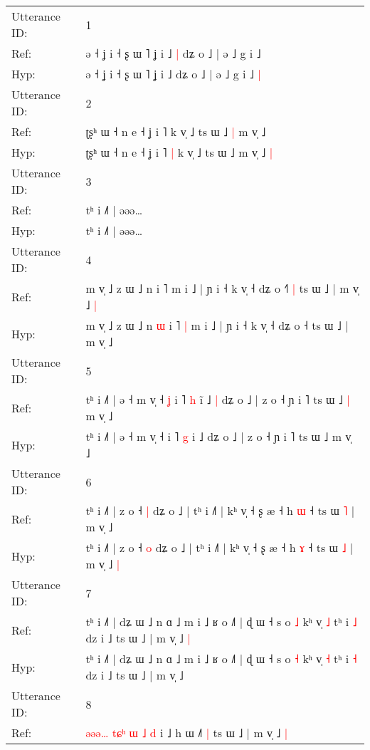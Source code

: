 \documentclass[10pt]{article}
\DeclareRobustCommand{\hl}[1]{{\textcolor{red}{#1}}}
\begin{document}
\begin{longtable}{ll}
\toprule
Utterance ID: & 1 \\
Ref: & ə ˧ ʝ i ˧ ʂ ɯ ˥ ʝ i ˩\hl{ }\hl{|} dʑ o ˩ | ə ˩ g i ˩\hl{}\hl{}
 \\
Hyp: & ə ˧ ʝ i ˧ ʂ ɯ ˥ ʝ i ˩\hl{}\hl{} dʑ o ˩ | ə ˩ g i ˩\hl{ }\hl{|}
 \\
\midrule
Utterance ID: & 2 \\
Ref: & ʈʂʰ ɯ ˧ n e ˧ ʝ i ˥\hl{}\hl{} k v̩ ˩ ts ɯ ˩\hl{ }\hl{|} m v̩ ˩\hl{}\hl{}
 \\
Hyp: & ʈʂʰ ɯ ˧ n e ˧ ʝ i ˥\hl{ }\hl{|} k v̩ ˩ ts ɯ ˩\hl{}\hl{} m v̩ ˩\hl{ }\hl{|}
 \\
\midrule
Utterance ID: & 3 \\
Ref: & tʰ i ˩˥ | əəə…
 \\
Hyp: & tʰ i ˩˥ | əəə…
 \\
\midrule
Utterance ID: & 4 \\
Ref: & m v̩ ˩ z ɯ ˩ n\hl{}\hl{} i ˥\hl{}\hl{} m i ˩ | ɲ i ˧ k v̩ ˧ dʑ o ˧\hl{˥}\hl{ }\hl{|} ts ɯ ˩ | m v̩ ˩\hl{ }\hl{|}
 \\
Hyp: & m v̩ ˩ z ɯ ˩ n\hl{ }\hl{ɯ} i ˥\hl{ }\hl{|} m i ˩ | ɲ i ˧ k v̩ ˧ dʑ o ˧\hl{}\hl{}\hl{} ts ɯ ˩ | m v̩ ˩\hl{}\hl{}
 \\
\midrule
Utterance ID: & 5 \\
Ref: & tʰ i ˩˥ | ə ˧ m v̩ ˧\hl{ }\hl{ʝ} i ˥ \hl{h} i\hl{̃} ˩\hl{ }\hl{|} dʑ o ˩ | z o ˧ ɲ i ˥ ts ɯ ˩\hl{ }\hl{|} m v̩ ˩
 \\
Hyp: & tʰ i ˩˥ | ə ˧ m v̩ ˧\hl{}\hl{} i ˥ \hl{g} i\hl{} ˩\hl{}\hl{} dʑ o ˩ | z o ˧ ɲ i ˥ ts ɯ ˩\hl{}\hl{} m v̩ ˩
 \\
\midrule
Utterance ID: & 6 \\
Ref: & tʰ i ˩˥ | z o ˧ \hl{|} dʑ o ˩ | tʰ i ˩˥ | kʰ v̩ ˧ ʂ æ ˧ h \hl{ɯ} ˧ ts ɯ \hl{˥} | m v̩ ˩\hl{}\hl{}
 \\
Hyp: & tʰ i ˩˥ | z o ˧ \hl{o} dʑ o ˩ | tʰ i ˩˥ | kʰ v̩ ˧ ʂ æ ˧ h \hl{ɤ} ˧ ts ɯ \hl{˩} | m v̩ ˩\hl{ }\hl{|}
 \\
\midrule
Utterance ID: & 7 \\
Ref: & tʰ i ˩˥ | dʑ ɯ ˩ n ɑ ˩ m i ˩ ʁ o ˩˥ | ɖ ɯ ˧ s o \hl{˩} kʰ v̩ \hl{˩} tʰ i \hl{˩} dz i ˩ ts ɯ ˩ | m v̩ ˩\hl{ }\hl{|}
 \\
Hyp: & tʰ i ˩˥ | dʑ ɯ ˩ n ɑ ˩ m i ˩ ʁ o ˩˥ | ɖ ɯ ˧ s o \hl{˧} kʰ v̩ \hl{˧} tʰ i \hl{˧} dz i ˩ ts ɯ ˩ | m v̩ ˩\hl{}\hl{}
 \\
\midrule
Utterance ID: & 8 \\
Ref: & \hl{ə}\hl{ə}\hl{ə}\hl{…} \hl{t}\hl{ɕ}\hl{ʰ} \hl{ɯ} \hl{˩} \hl{d} i ˩ h ɯ ˩\hl{˥}\hl{ }\hl{|} ts ɯ ˩ | m v̩ ˩\hl{ }\hl{|}

\end{longtable}
\end{document}
